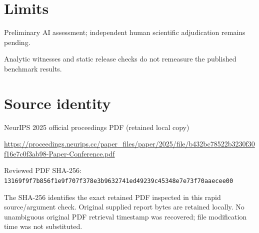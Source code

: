 \documentclass[11pt]{article}
\begin{document}
\section*{Limits}

Preliminary AI assessment; independent human scientific adjudication remains pending.\par

Analytic witnesses and static release checks do not remeasure the published benchmark results.\par

\section*{Source identity}

NeurIPS 2025 official proceedings PDF (retained local copy)

\url{https://proceedings.neurips.cc/paper_files/paper/2025/file/b432bc78522b3230f30f16e7c0f3ab98-Paper-Conference.pdf}

Reviewed PDF SHA-256: \nolinkurl{13169f9f7b856f1e9f707f378e3b9632741ed49239c45348e7e73f70aaecee00}

The SHA-256 identifies the exact retained PDF inspected in this rapid source/argument check. Original supplied report bytes are retained locally. No unambiguous original PDF retrieval timestamp was recovered; file modification time was not substituted.
\end{document}
